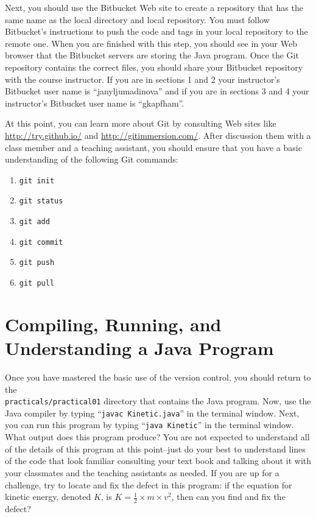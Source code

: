 Next, you should use the Bitbucket Web site to create a repository that has the same name as the local directory and
local repository.  You must follow Bitbucket's instructions to push the code and tags in your local repository to the
remote one. When you are finished with this step, you should see in your Web browser that the Bitbucket servers are
storing the Java program. Once the Git repository contains the correct files, you should share your Bitbucket repository
with the course instructor. If you are in sections 1 and 2 your instructor's Bitbucket user name is ``janyljumadinova'' and if you are in sections 3 and 4 your instructor's Bitbucket user name is ``gkapfham''.

At this point, you can learn more about Git by consulting Web sites like \url{http://try.github.io/} and
\url{http://gitimmersion.com/}.  After discussion them with a class member and a teaching assistant, you should ensure
that you have a basic understanding of the following Git commands:

\vspace*{-.125in}
\begin{enumerate} 
  \setlength{\itemsep}{-.03in}
  \item {\tt git init}
  \item {\tt git status}
  \item {\tt git add} 
  \item {\tt git commit}
  \item {\tt git push}
  \item {\tt git pull} 
\end{enumerate}
\vspace*{-.125in}

\section*{Compiling, Running, and Understanding a Java Program}

Once you have mastered the basic use of the version control, you should return to the \\ {\tt practicals/practical01}
directory that contains the Java program. Now, use the Java compiler by typing ``{\tt javac Kinetic.java}'' in the
terminal window.  Next, you can run this program by typing ``{\tt java Kinetic}'' in the terminal window.  What output does this program produce?  
You are not expected to understand all of the details of this program at this point--just do your best to understand lines of the code that look familiar consulting your text book and talking about it with
your classmates and the teaching assistants as needed. If you are up for a challenge, try to locate and fix the defect in this program: if the equation for kinetic energy, denoted $K$, is $K=\frac{1}{2} \times m \times v^2$, then can you find and fix the defect?


